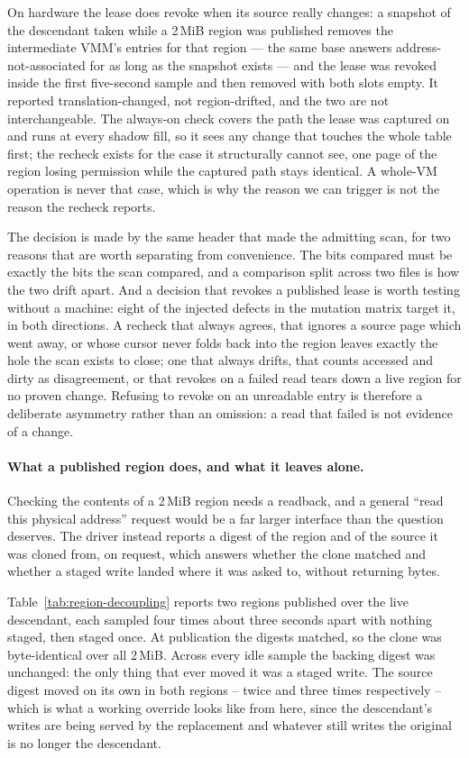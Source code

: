 On hardware the lease does revoke when its source really changes: a snapshot of
the descendant taken while a 2\,MiB region was published removes the
intermediate VMM's entries for that region --- the same base answers
address-not-associated for as long as the snapshot exists --- and the lease was
revoked inside the first five-second sample and then removed with both slots
empty. It reported translation-changed, not region-drifted, and the two are not
interchangeable. The always-on check covers the path the lease was captured on
and runs at every shadow fill, so it sees any change that touches the whole
table first; the recheck exists for the case it structurally cannot see, one
page of the region losing permission while the captured path stays identical.
A whole-VM operation is never that case, which is why the reason we can trigger
is not the reason the recheck reports.

The decision is made by the same header that made the admitting scan, for two
reasons that are worth separating from convenience. The bits compared must be
exactly the bits the scan compared, and a comparison split across two files is
how the two drift apart. And a decision that revokes a published lease is worth
testing without a machine: eight of the injected defects in the mutation matrix
target it, in both directions. A recheck that always agrees, that ignores a
source page which went away, or whose cursor never folds back into the region
leaves exactly the hole the scan exists to close; one that always drifts, that
counts accessed and dirty as disagreement, or that revokes on a failed read
tears down a live region for no proven change. Refusing to revoke on an
unreadable entry is therefore a deliberate asymmetry rather than an omission: a
read that failed is not evidence of a change.

\paragraph{What a published region does, and what it leaves alone.}
Checking the contents of a 2\,MiB region needs a readback, and a general
``read this physical address'' request would be a far larger interface than the
question deserves. The driver instead reports a digest of the region and of the
source it was cloned from, on request, which answers whether the clone matched
and whether a staged write landed where it was asked to, without returning bytes.

Table~\ref{tab:region-decoupling} reports two regions published over the live
descendant, each sampled four times about three seconds apart with nothing
staged, then staged once. At publication the digests matched, so the clone was
byte-identical over all 2\,MiB. Across every idle sample the backing digest was
unchanged: the only thing that ever moved it was a staged write. The source
digest moved on its own in both regions -- twice and three times respectively --
which is what a working override looks like from here, since the descendant's
writes are being served by the replacement and whatever still writes the original
is no longer the descendant.

